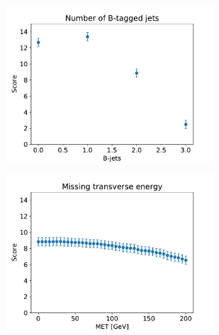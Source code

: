 \documentclass[%
 reprint,
 amsmath,amssymb,
 aps,
]{revtex4-2}
\begin{document}
\begin{figure}
        \centering
        \begin{subfigure}[b]{0.475\textwidth}
            \centering
            \includegraphics[width=\textwidth]{Plots/part1/Plot_Bjets.pdf}
            \label{fig:mean and std of net14}
        \end{subfigure}
        \hfill
        \begin{subfigure}[b]{0.475\textwidth}  
            \centering 
            \includegraphics[width=\textwidth]{Plots/part1/Plot_MET.pdf}
            \label{fig:mean and std of net24}
        \end{subfigure}

\end{figure}
\end{document}
